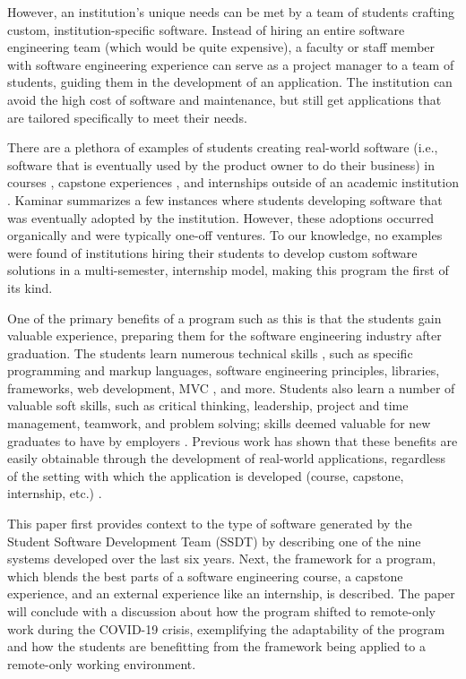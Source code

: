 However, an institution's unique needs can be met by a team of students crafting custom, institution-specific software. Instead of hiring an entire software engineering team (which would be quite expensive), a faculty or staff member with software engineering experience can serve as a project manager to a team of students, guiding them in the development of an application. The institution can avoid the high cost of software and maintenance, but still get applications that are tailored specifically to meet their needs.

There are a plethora of examples of students creating real-world software (i.e., software that is eventually used by the product owner to do their business) in courses \cite{coursevsproject, tadayon2004software}, capstone experiences \cite{keogh2007scalable, capstone}, and internships outside of an academic institution \cite{rochesterfirstundergradsoftwareteam}. Kaminar \cite{kaminer_2014} summarizes a few instances where students developing software that was eventually adopted by the institution. However, these adoptions occurred organically and were typically one-off ventures. To our knowledge, no examples were found of institutions hiring their students to develop custom software solutions in a multi-semester, internship model, making this program the first of its kind.

One of the primary benefits of a program such as this is that the students gain valuable experience, preparing them for the software engineering industry after graduation. The students learn numerous technical skills \cite{hardskills}, such as specific programming and markup languages, software engineering principles, libraries, frameworks, web development, MVC \cite{mvc}, and more. Students also learn a number of valuable soft skills, such as critical thinking, leadership, project and time management, teamwork, and problem solving; skills deemed valuable for new graduates to have by employers \cite{lavy2013soft}. Previous work has shown that these benefits are easily obtainable through the development of real-world applications, regardless of the setting with which the application is developed (course, capstone, internship, etc.) \cite{heggen2018hiring, liu2005enriching, alzamil2005towards}.

This paper first provides context to the type of software generated by the Student Software Development Team (SSDT) by describing one of the nine systems developed over the last six years. Next, the framework for a program, which blends the best parts of a software engineering course, a capstone experience, and an external experience like an internship, is described. The paper will conclude with a discussion about how the program shifted to remote-only work during the COVID-19 crisis, exemplifying the adaptability of the program and how the students are benefitting from the framework being applied to a remote-only working environment.

